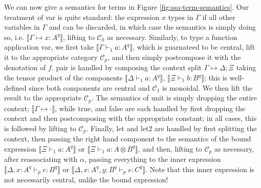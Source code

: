 \documentclass[acmsmall,screen,review]{acmart}
\newcommand{\mc}[1]{\ensuremath{\mathcal{#1}}}
\newcommand{\csplits}[3]{#1 \mapsto #2;#3}
\newcommand{\cwk}[2]{#1 \mapsto #2}
\newcommand{\thyp}[3]{#1: {#2}^{#3}}
\newcommand{\rle}[1]{{\scriptsize\textsf{#1}}}
\newcommand{\hasty}[5]{#1 \vdash_{#2} #3: {#4}^{#5}}
\newcommand{\dnt}[1]{\llbracket{#1}\rrbracket}
\begin{document}
We can now give a semantics for terms in Figure \ref{fig:ssa-term-semantics}.
Our treatment of \rle{var} is quite standard: the expression \(x\) types in
\(\Gamma\) if all other variables in \(\Gamma\) and can be discarded, in which
case the semantics is simply doing so, i.e.
\(\dnt{\cwk{\Gamma}{\thyp{x}{A}{q}}}\), lifting to \(\mc{C}_0\) as necessary.
Similarly, to type a function application \rle{var}, we first take
\(\dnt{\hasty{\Gamma}{1}{a}{A}{q}}\), which is guarnateed to be central, lift it
to the appropriate category \(\mc{C}_p\), and then simply postcompose it with
the denotation of \(f\). \rle{pair} is handled by composing the context split
\(\csplits{\Gamma}{\Delta}{\Xi}\) taking the tensor product of the components
\(\dnt{\hasty{\Delta}{1}{a}{A}{q}}\), \(\dnt{\hasty{\Xi}{1}{b}{B}{q}}\); this is
well-defined since both components are central and \(\mc{C}_1\) is monoidal. We
then lift the result to the appropriate \(\mc{C}_p\). The semantics of
\rle{unit} is simply dropping the entire context; \(\dnt{\cwk{\Gamma}{\cdot}}\),
while \rle{true}, and \rle{false} are each handled by first dropping the context
and then postcomposing with the appropriate constant; in all cases, this is
followed by lifting to \(\mc{C}_p\). Finally, \rle{let} and \rle{let2} are
handled by first splitting the context, then passing the right hand component to
the semantics of the bound expression \(\dnt{\hasty{\Xi}{1}{a}{A}{q}}\) or
\(\dnt{\hasty{\Xi}{1}{a}{A \otimes B}{q}}\), and then, lifting to \(\mc{C}_p\)
as necessary, after reassociating with \(\alpha\), passing everything to the
inner expression \(\dnt{\hasty{\Delta, \thyp{x}{A}{q}}{p}{e}{B}{q}}\) or
\(\dnt{\hasty{\Delta, \thyp{x}{A}{q}, \thyp{y}{B}{q}}{p}{e}{C}{q}}\). Note that
this inner expression is not necessarily central, unlike the bound expression!
\end{document}
